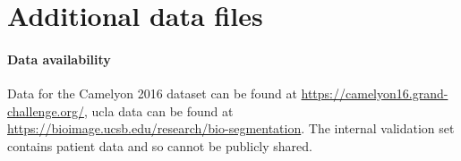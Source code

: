 \documentclass[review]{elsarticle}
\begin{document}
    

\section{Additional data files}
\paragraph{Data availability} Data for the Camelyon 2016 dataset can be found at \url{https://camelyon16.grand-challenge.org/}, \gls{ucla} data can be found at \url{https://bioimage.ucsb.edu/research/bio-segmentation}. The internal validation set contains patient data and so cannot be publicly shared.
\end{document}
